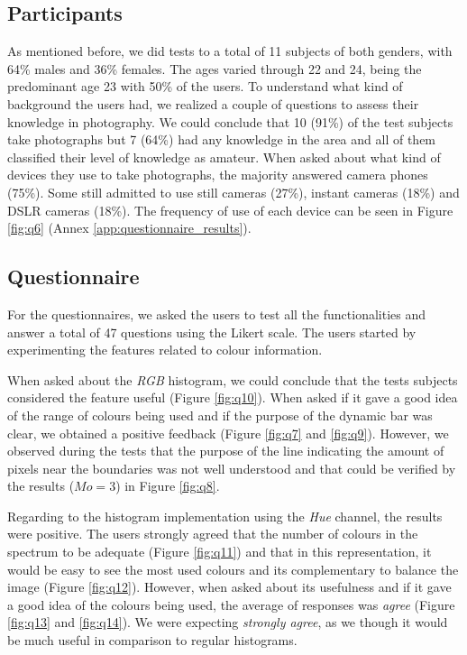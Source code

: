 \subsection{Participants}

As mentioned before, we did tests to a total of 11 subjects of both genders, with 64\% males and 36\% females. The ages varied through 22 and 24, being the predominant age 23 with 50\% of the users. To understand what kind of background the users had, we realized a couple of questions to assess their knowledge in photography. We could conclude that 10 (91\%) of the test subjects take photographs but 7 (64\%) had any knowledge in the area and all of them classified their level of knowledge as amateur. When asked about what kind of devices they use to take photographs, the majority answered camera phones (75\%). Some still admitted to use still cameras (27\%), instant cameras (18\%) and DSLR cameras (18\%). The frequency of use of each device can be seen in Figure \ref{fig:q6} (Annex \ref{app:questionnaire_results}).

\subsection{Questionnaire}

For the questionnaires, we asked the users to test all the functionalities and answer a total of 47 questions using the Likert scale. The users started by experimenting the features related to colour information. 

When asked about the \emph{RGB} histogram, we could conclude that the tests subjects considered the feature useful (Figure \ref{fig:q10}). When asked if it gave a good idea of the range of colours being used and if the purpose of the dynamic bar was clear, we obtained a positive feedback (Figure \ref{fig:q7} and \ref{fig:q9}). However, we observed during the tests that the purpose of the line indicating the amount of pixels near the boundaries was not well understood and that could be verified by the results ($Mo = 3$) in Figure \ref{fig:q8}.

Regarding to the histogram implementation using the \emph{Hue} channel, the results were positive. The users strongly agreed that the number of colours in the spectrum to be adequate (Figure \ref{fig:q11}) and that in this representation, it would be easy to see the most used colours and its complementary to balance the image (Figure \ref{fig:q12}). However, when asked about its usefulness and if it gave a good idea of the colours being used, the average of responses was \emph{agree} (Figure \ref{fig:q13} and \ref{fig:q14}). We were expecting \emph{strongly agree}, as we though it would be much useful in comparison to regular histograms.

